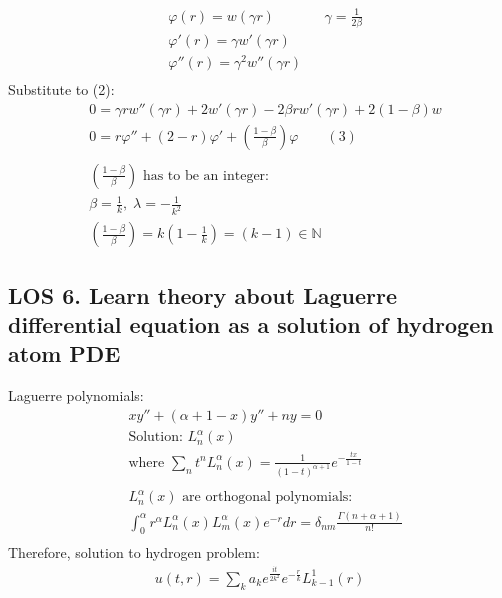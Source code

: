 \documentclass[12pt, a4paper]{article}
\begin{document}
\begin{align*}
    &\varphi(r) = w(\gamma r)&&\gamma = \frac{1}{2\beta}\\
    &\varphi'(r) = \gamma w'(\gamma r)\\
    &\varphi''(r) = \gamma^2w''(\gamma r)\\
\end{align*}
Substitute to (2):
\begin{align*}
    & 0 = \gamma r w''(\gamma r) + 2w'(\gamma r) - 2\beta r w'(\gamma r) + 2(1-\beta)w\\
    & 0 = r \varphi'' + (2-r)\varphi' + \left(\frac{1-\beta}{\beta}\right)\varphi \qquad (3)\\\\
    &\left(\frac{1-\beta}{\beta}\right)\text{ has to be an integer:}\\
    &\beta = \frac{1}{k}, \;\lambda = -\frac{1}{k^2}\\
    &\left(\frac{1-\beta}{\beta}\right) = k\left(1-\frac{1}{k}\right) = (k-1) \in \mathbb{N}
\end{align*}
\vspace{0.3em}

\subsection*{LOS 6. Learn theory about Laguerre differential equation as a solution of hydrogen atom PDE}
Laguerre polynomials:
\begin{align*}
    &xy'' + (\alpha + 1 - x)y'' + ny = 0\\
    &\text{Solution: }L_n^\alpha (x)\\
    &\text{where }\sum_n t^n L_n^\alpha (x) = \frac{1}{(1-t)^{\alpha + 1}}e^{-\frac{tx}{1-t}}\\\\
    &L_n^\alpha (x)\text{ are orthogonal polynomials:}\\
    &\int_0^\alpha r^\alpha L_n^\alpha (x)L_m^\alpha (x)e^{-r}dr = \delta_{nm}\frac{\Gamma(n+\alpha+1)}{n!}\\
\end{align*}
Therefore, solution to hydrogen problem:
\begin{align*}
    u(t, r) = \sum_k a_k e^{\frac{it}{2k^2}}e^{-\frac{r}{k}}L_{k-1}^1(r)\\
\end{align*}
\vspace{0.3em}
\end{document}
